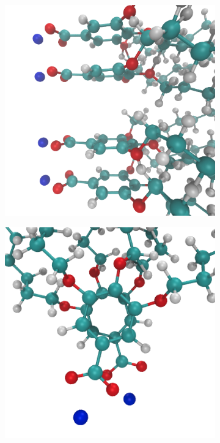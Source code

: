 \documentclass[journal=jpcbfk,manusciprt=article]{achemso}
\begin{document}
  
  \begin{figure}[!htb]
  \centering
  \begin{subfigure}{0.3\linewidth}
  	\centering
  	\includegraphics[width=\textwidth]{staggered.png}
	\label{fig:staggered}
  \end{subfigure}
  \begin{subfigure}{0.3\linewidth}
  	\centering
  	\includegraphics[width=\textwidth]{rotated_monomers.png}

\end{subfigure}
\end{figure}
\end{document}

